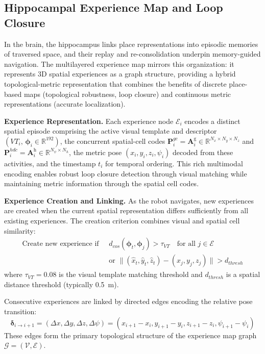 \subsection{Hippocampal Experience Map and Loop Closure}
\label{sec:loop_closure}

In the brain, the hippocampus links place representations into episodic memories of traversed space, and their replay and re-consolidation underpin memory-guided navigation. The multilayered experience map mirrors this organization: it represents 3D spatial experiences as a graph structure, providing a hybrid topological-metric representation that combines the benefits of discrete place-based maps (topological robustness, loop closure) and continuous metric representations (accurate localization).

\textbf{Experience Representation.} Each experience node $\mathcal{E}_i$ encodes a distinct spatial episode comprising the active visual template and descriptor $(VT_i,\,\boldsymbol{\phi}_i\in\mathbb{R}^{192})$, the concurrent spatial-cell codes $\mathbf{P}^{gc}_i=\mathbf{A}^\mathrm{g}_i\in\mathbb{R}^{N_x\times N_y\times N_z}$ and $\mathbf{P}^{hdc}_i=\mathbf{A}^\mathrm{h}_i\in\mathbb{R}^{N_\psi\times N_h}$, the metric pose $(x_i, y_i, z_i, \psi_i)$ decoded from these activities, and the timestamp $t_i$ for temporal ordering.
This rich multimodal encoding enables robust loop closure detection through visual matching while maintaining metric information through the spatial cell codes.

\textbf{Experience Creation and Linking.} As the robot navigates, new experiences are created when the current spatial representation differs sufficiently from all existing experiences. The creation criterion combines visual and spatial cell similarity:
\begin{equation}
    \begin{aligned}
        \text{Create new experience if }\; & d_{cos}(\boldsymbol{\phi}_t, \boldsymbol{\phi}_j) > \tau_{VT} \quad \text{for all } j \in \mathcal{E} \\
                                           & \text{or } \lVert (\hat{x}_t, \hat{y}_t, \hat{z}_t) - (x_j, y_j, z_j) \rVert > d_{thresh}
    \end{aligned}
\end{equation}
where $\tau_{VT} = 0.08$ is the visual template matching threshold and $d_{thresh}$ is a spatial distance threshold (typically 0.5~m).

Consecutive experiences are linked by directed edges encoding the relative pose transition:
\begin{equation}
    \boldsymbol{\delta}_{i \to i+1} = (\Delta x, \Delta y, \Delta z, \Delta \psi) = (x_{i+1} - x_i, y_{i+1} - y_i, z_{i+1} - z_i, \psi_{i+1} - \psi_i)
    \label{eq:edge}
\end{equation}
These edges form the primary topological structure of the experience map graph $\mathcal{G} = (\mathcal{V}, \mathcal{E})$.

